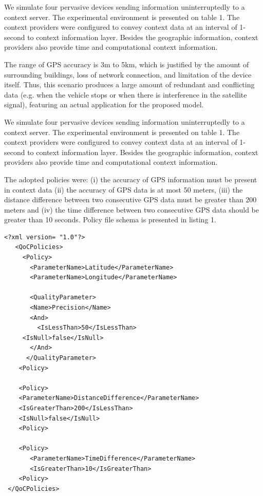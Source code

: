 \documentclass[letterpaper,conference]{IEEEtran}
\begin{document}
  We simulate four pervasive devices sending information uninterruptedly to a context 
  server. The experimental environment is presented on table 1. The context providers 
  were configured to convey context data at an interval of 1-second to context 
  information layer. Besides the geographic information, context providers also 
  provide time and computational context information.
  
  The range of GPS accuracy is 3m to 5km, which is justified by the amount of 
  surrounding buildings, loss of network connection, and limitation of the device itself.
  Thus, this scenario produces a large amount of redundant and conflicting data (e.g. 
  when the vehicle stops or when there is interference in the satellite signal), 
  featuring an actual application for the proposed model. 

  We simulate four pervasive devices sending information uninterruptedly to a context 
  server. The experimental environment is presented on table 1. The context providers 
  were configured to convey context data at an interval of 1-second to context 
  information layer. Besides the geographic information, context providers also 
  provide time and computational context information.

  The adopted policies were: (i) the accuracy of GPS information must be present in 
  context data (ii) the accuracy of GPS data is at most 50 meters, (iii) the distance 
  difference between two consecutive GPS data must be greater than 200 meters and (iv) 
  the time difference between two consecutive GPS data should be greater than 10 seconds.
  Policy file schema is presented in listing 1.
  
	 
    \noindent\begin{minipage}{0.475\textwidth}
  \begin{lstlisting}[frame=single, caption=XML representation of a QoC policy file]
   <?xml version= "1.0"?>
   <QoCPolicies>
     <Policy>
       <ParameterName>Latitude</ParameterName>
       <ParameterName>Longitude</ParameterName>
      
       <QualityParameter>
       <Name>Precision</Name>
       <And>
         <IsLessThan>50</IsLessThan>          
	 <IsNull>false</IsNull>         
       </And>  
      </QualityParameter>  
    <Policy>
    
    <Policy>
	<ParameterName>DistanceDifference</ParameterName>
	<IsGreaterThan>200</IsLessThan>          
	<IsNull>false</IsNull>         
    <Policy>
    
    <Policy>
       <ParameterName>TimeDifference</ParameterName>
       <IsGreaterThan>10</IsGreaterThan>
    <Policy>
 </QoCPolicies> 
    \end{lstlisting}
  \end{minipage}
  
\end{document}
